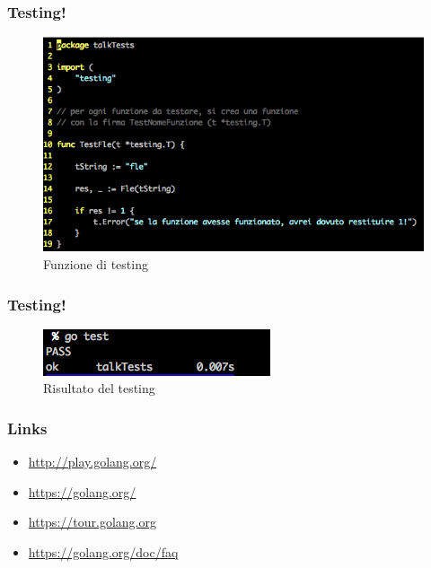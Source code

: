 \documentclass[12pt]{beamer}
\begin{document}
	\begin{frame}
		\frametitle{Testing!}
		\begin{figure}
			\centering
			\includegraphics[width=0.7\linewidth]{realtestfunc}
			\caption[Funzione test]{Funzione di testing}
			\label{fig:testfunc}
		\end{figure}
	\end{frame}
	
	\begin{frame}
		\frametitle{Testing!}
		\begin{figure}
			\centering
			\includegraphics[width=0.7\linewidth]{result}
			\caption[Risultato]{Risultato del testing}
			\label{fig:testfunc}
		\end{figure}
	\end{frame}
	
	\begin{frame}
		\frametitle{Links}
		\begin{itemize}
			\item \url{http://play.golang.org/}
			\item \url{https://golang.org/}
			\item \url{https://tour.golang.org}
			\item \url{https://golang.org/doc/faq}
		\end{itemize}
	\end{frame}
\end{document}
